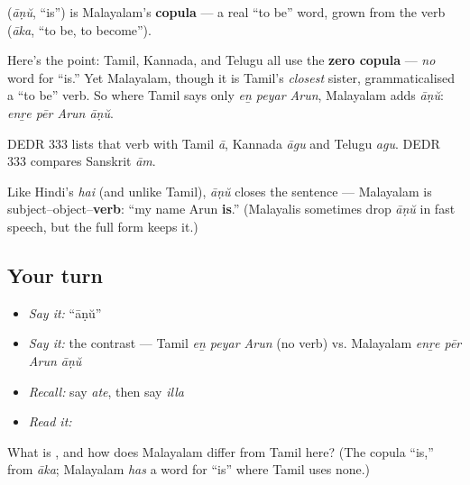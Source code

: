 \begin{cousinweb}
\textbf{} (\emph{āṇŭ}, \textquotedblleft{}is\textquotedblright{}) is Malayalam's \textbf{copula} — a real \textquotedblleft{}to be\textquotedblright{} word, grown from the verb \textbf{} (\emph{āka}, \textquotedblleft{}to be, to become\textquotedblright{}).

Here's the point: Tamil, Kannada, and Telugu all use the \textbf{zero copula} — \emph{no} word for \textquotedblleft{}is.\textquotedblright{} Yet Malayalam, though it is Tamil's \emph{closest} sister, grammaticalised a \textquotedblleft{}to be\textquotedblright{} verb. So where Tamil says only \emph{eṉ peyar Arun}, Malayalam adds \emph{āṇŭ}: \emph{enṟe pēr Arun āṇŭ}.

DEDR 333 lists that verb with Tamil \emph{ā}, Kannada \emph{āgu} and Telugu \emph{agu}. DEDR 333 compares Sanskrit \emph{ām}.
\end{cousinweb}

\begin{grammarlens}[title={Grammar Lens: the verb comes last}]
Like Hindi's \emph{hai} (and unlike Tamil), \emph{āṇŭ} closes the sentence — Malayalam is subject–object–\textbf{verb}: \textquotedblleft{}my name Arun \textbf{is}.\textquotedblright{} (Malayalis sometimes drop \emph{āṇŭ} in fast speech, but the full form keeps it.)
\end{grammarlens}

\subsection*{Your turn}
\begin{itemize}
\raggedright
  \item \emph{Say it:} \textquotedblleft{}āṇŭ\textquotedblright{}
  \item \emph{Say it:} the contrast — Tamil \emph{eṉ peyar Arun} (no verb) vs. Malayalam \emph{enṟe pēr Arun āṇŭ}
  \item \emph{Recall:} say \emph{ate}, then say \emph{illa}
  \item \emph{Read it:} \textbf{}
\end{itemize}

\begin{tcolorbox}[breakable,colback=teal!4,colframe=teal!35!black,title={Before you move on}]
What is \textbf{}, and how does Malayalam differ from Tamil here? (The copula \textquotedblleft{}is,\textquotedblright{} from \emph{āka}; Malayalam \emph{has} a word for \textquotedblleft{}is\textquotedblright{} where Tamil uses none.)
\end{tcolorbox}
